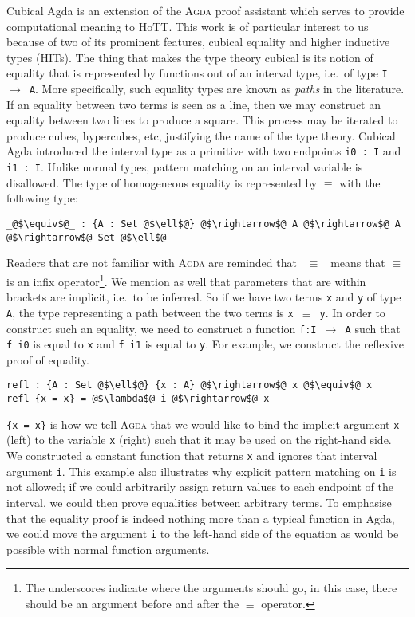 \documentclass[12pt,twoside,maitrise]{dms}
\theoremstyle{definition}
\numberwithin{equation}{section}
\numberwithin{table}{chapter}
\numberwithin{figure}{chapter}
\newcommand\id[1] {\texttt{#1}}
\newcommand\fn[1] {\texttt{#1}}
\def\Agda{\textsc{Agda}\xspace}
\begin{document}
Cubical Agda\cite{vezzosi2021cubical} is an extension of the \Agda{} proof
assistant which serves to provide computational meaning to HoTT. This work is
of particular interest to us because of two of its prominent features, cubical
equality and higher inductive types (HITs). The thing that makes the type theory
cubical is its notion of equality that is represented by functions out of an
interval type, i.e.\ of type \fn{I $\rightarrow$ A}. More specifically, such
equality types are known as \emph{paths} in the literature. If an equality
between two terms is seen as a line, then we may construct an equality between
two lines to produce a square. This process may be iterated to produce cubes,
hypercubes, etc, justifying the name of the type theory. Cubical Agda introduced
the interval type as a primitive with two endpoints \fn{i0 : I} and \fn{i1 : I}.
Unlike normal types, pattern matching on an interval variable is disallowed. The
type of homogeneous equality is represented by $\equiv$ with the following type:

\begin{verbatim}
_@$\equiv$@_ : {A : Set @$\ell$@} @$\rightarrow$@ A @$\rightarrow$@ A @$\rightarrow$@ Set @$\ell$@
\end{verbatim}

Readers that are not familiar with \Agda{} are reminded that \fn{\_$\equiv$\_}
means that $\equiv$ is an infix operator\footnote{The underscores indicate where
the arguments should go, in this case, there should be an argument before and
after the $\equiv$ operator.}. We mention as well that parameters that are
within brackets are implicit, i.e.\ to be inferred. So if we have two terms
\id{x} and \id{y} of type \id{A}, the type representing a path between the two
terms is \fn{x $\equiv$ y}. In order to construct such an equality, we need to
construct a function \id{f:I $\rightarrow$ A} such that \fn{f i0} is equal to
\id{x} and \fn{f i1} is equal to \id{y}. For example, we construct the reflexive
proof of equality.

\begin{verbatim}
refl : {A : Set @$\ell$@} {x : A} @$\rightarrow$@ x @$\equiv$@ x
refl {x = x} = @$\lambda$@ i @$\rightarrow$@ x
\end{verbatim}

\fn{\{x = x\}} is how we tell \Agda{} that we would like to bind the implicit
argument \id{x} (left) to the variable \id{x} (right) such that it may be used
on the right-hand side. We constructed a constant function that returns \id{x}
and ignores that interval argument \id{i}. This example also illustrates why
explicit pattern matching on \id{i} is not allowed; if we could arbitrarily
assign return values to each endpoint of the interval, we could then prove
equalities between arbitrary terms. To emphasise that the equality proof is
indeed nothing more than a typical function in Agda, we could move the argument
\id{i} to the left-hand side of the equation as would be possible with normal
function arguments.
\end{document}
